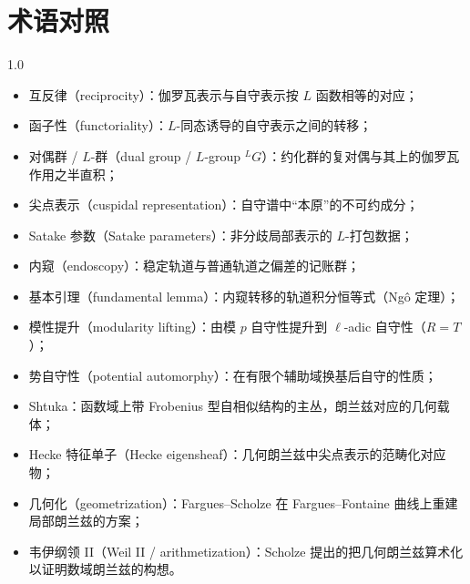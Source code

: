 \section*{术语对照}
\begin{spacing}{1.0}
\begin{itemize}[itemsep=0pt,topsep=4pt]
    \item 互反律（reciprocity）：伽罗瓦表示与自守表示按 $L$ 函数相等的对应；
    \item 函子性（functoriality）：$L$-同态诱导的自守表示之间的转移；
    \item 对偶群 / $L$-群（dual group / $L$-group $^LG$）：约化群的复对偶与其上的伽罗瓦作用之半直积；
    \item 尖点表示（cuspidal representation）：自守谱中“本原”的不可约成分；
    \item Satake 参数（Satake parameters）：非分歧局部表示的 $L$-打包数据；
    \item 内窥（endoscopy）：稳定轨道与普通轨道之偏差的记账群；
    \item 基本引理（fundamental lemma）：内窥转移的轨道积分恒等式（Ng\^o 定理）；
    \item 模性提升（modularity lifting）：由模 $p$ 自守性提升到 $\ell$-adic 自守性（$R=T$）；
    \item 势自守性（potential automorphy）：在有限个辅助域换基后自守的性质；
    \item Shtuka：函数域上带 Frobenius 型自相似结构的主丛，朗兰兹对应的几何载体；
    \item Hecke 特征单子（Hecke eigensheaf）：几何朗兰兹中尖点表示的范畴化对应物；
    \item 几何化（geometrization）：Fargues--Scholze 在 Fargues--Fontaine 曲线上重建局部朗兰兹的方案；
    \item 韦伊纲领 II（Weil II / arithmetization）：Scholze 提出的把几何朗兰兹算术化以证明数域朗兰兹的构想。
\end{itemize}
\end{spacing}
